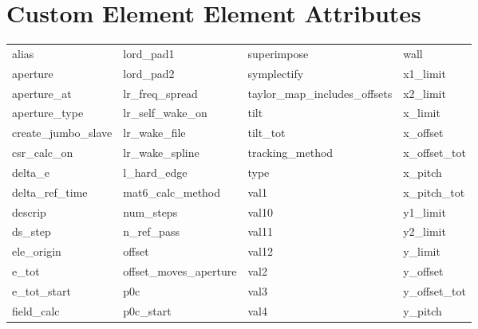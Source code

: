  \section{Custom Element Element Attributes}
 \label{s:list.custom}
 
 \begin{tabular}{llll} \toprule
alias                       & lord_pad1                   & superimpose                 & wall                        \\
aperture                    & lord_pad2                   & symplectify                 & x1_limit                    \\
aperture_at                 & lr_freq_spread              & taylor_map_includes_offsets & x2_limit                    \\
aperture_type               & lr_self_wake_on             & tilt                        & x_limit                     \\
create_jumbo_slave          & lr_wake_file                & tilt_tot                    & x_offset                    \\
csr_calc_on                 & lr_wake_spline              & tracking_method             & x_offset_tot                \\
delta_e                     & l_hard_edge                 & type                        & x_pitch                     \\
delta_ref_time              & mat6_calc_method            & val1                        & x_pitch_tot                 \\
descrip                     & num_steps                   & val10                       & y1_limit                    \\
ds_step                     & n_ref_pass                  & val11                       & y2_limit                    \\
ele_origin                  & offset                      & val12                       & y_limit                     \\
e_tot                       & offset_moves_aperture       & val2                        & y_offset                    \\
e_tot_start                 & p0c                         & val3                        & y_offset_tot                \\
field_calc                  & p0c_start                   & val4                        & y_pitch                     \\

\end{tabular}
